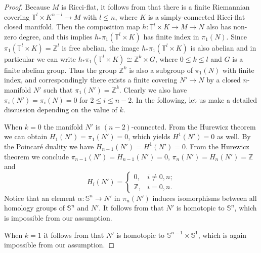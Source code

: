 \documentclass[11pt,letterpaper]{amsart}
\numberwithin{equation}{section}
\theoremstyle{definition}
\begin{document}
\begin{proof}
Because $M$ is Ricci-flat, it follows from {\cite[Theorem 4.5]{FW75}} that there is a finite Riemannian covering $\mathbb{T}^{l} \times K^{n-l} \to M$ with $l \le n$, where $K$ is a simply-connected Ricci-flat closed manifold. Then the composition map $h: \mathbb{T}^l \times K \to M \to N$ also has non-zero degree, and this implies $h_* \pi_1(\mathbb{T}^l \times K)$ has finite index in $\pi_1(N)$. Since $\pi_1(\mathbb{T}^l \times K) = \mathbb{Z}^l$ is free abelian, the image $h_* \pi_1({\mathbb{T}^{l} \times K})$ is also abelian and in particular we can write $h_* \pi_1({\mathbb{T}^{l} \times K}) \cong \mathbb{Z}^{k} \times G$, where $0 \le k \le l$ and $G$ is a finite abelian group. Thus the group $\mathbb{Z}^{k}$ is also a subgroup of $\pi_1(N)$ with finite index, and correspondingly there exists a finite covering $N' \to N$ by a closed $n$-manifold $N'$ such that $\pi_1(N') = \mathbb{Z}^{k}$. Clearly we also have $\pi_i(N') =  \pi_i(N) = 0$ for $2 \le i \le n-2$.
In the following, let us make a detailed discussion depending on the value of $k$.

When $k=0$ the manifold $N'$ is $(n-2)$-connected. From the Hurewicz theorem we can obtain $H_1(N') = \pi_1(N') = 0$, which yields $H^1(N') = 0$ as well. By the Poincar\'e duality we have $H_{n-1}(N') =H^1(N') = 0$. From the Hurewicz theorem we conclude $\pi_{n-1}(N')=H_{n-1}(N')=0$, $\pi_n(N')=H_n(N')=\mathbb Z$ and
\[
H_i(N')=\left\{\begin{array}{cc}
0,& i\neq 0,n;\\
\mathbb Z,&i=0,n.
\end{array}\right.
\]
Notice that an element $\alpha:\mathbb S^n\to N'$ in $\pi_n(N')$ induces isomorphisms between all homology groups of $\mathbb S^n$ and $N'$. It follows from \cite[Corollary 4.33]{Hat02} that $N'$ is homotopic to $\mathbb{S}^n$, which is impossible from our assumption.

When $k=1$ it follows from \cite[Theorem 1.3]{GS09} that $N'$ is homotopic to $\mathbb{S}^{n-1} \times \mathbb{S}^1$, which is again impossible from our assumption.


\end{proof}
\end{document}
